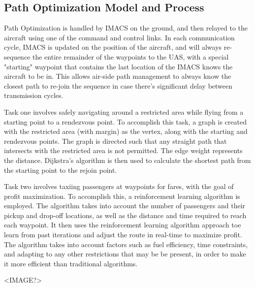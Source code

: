 \subsection{Path Optimization Model and Process}
\label{sec:path-optimization}

Path Optimization is handled by IMACS on the ground, and then relayed to the aircraft
using one of the command and control links. In each communication cycle, IMACS is
updated on the position of the aircraft, and will always re-sequence the entire
remainder of the waypoints to the UAS, with a special "starting" waypoint that
contains the last location of the IMACS knows the aircraft to be in. This allows
air-side path management to always know the closest path to re-join the sequence in case there's significant delay between transmission cycles.

Task one involves safely navigating around a restricted area while flying from 
a starting point to a rendezvous point. To accomplish this task, a graph is created
with the restricted area (with margin) as the vertex, along with the starting
and rendezvous points. The graph is directed such that any straight path that
intersects with the restricted area is not permitted. The edge weight represents the
distance. Dijkstra's algorithm is then used to calculate the shortest path from the 
starting point to the rejoin point.

Task two involves taxiing passengers at waypoints for fares, with the goal of profit
maximization. To accomplish this, a reinforcement learning algorithm is employed. The
algorithm takes into account the number of passengers and their pickup and drop-off
locations, as well as the distance and time required to reach each waypoint. It then
uses the reinforcement learning algorithm approach toe learn from past iterations
and adjust the route in real-time to maximize profit. The algorithm takes into account
factors such as fuel efficiency, time constraints, and adapting to any other
restrictions that may be be present, in order to make it more efficient than
traditional algorithms.

<IMAGE?>
